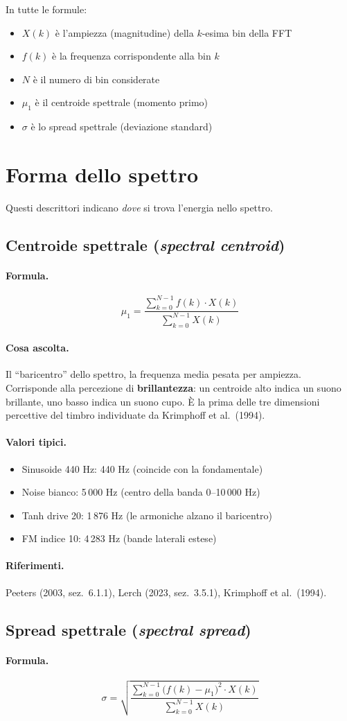 \documentclass[a4paper,11pt]{article}
\newcommand{\desc}[1]{\subsection{#1}}
\newcommand{\formula}{\paragraph{Formula.}}
\newcommand{\ascolta}{\paragraph{Cosa ascolta.}}
\newcommand{\range}{\paragraph{Valori tipici.}}
\newcommand{\rif}{\paragraph{Riferimenti.}}
\begin{document}
In tutte le formule:
\begin{itemize}[nosep]
  \item $X(k)$ è l'ampiezza (magnitudine) della $k$-esima bin della FFT
  \item $f(k)$ è la frequenza corrispondente alla bin $k$
  \item $N$ è il numero di bin considerate
  \item $\mu_1$ è il centroide spettrale (momento primo)
  \item $\sigma$ è lo spread spettrale (deviazione standard)
\end{itemize}


\section{Forma dello spettro}

Questi descrittori indicano \emph{dove} si trova l'energia nello spettro.

\desc{Centroide spettrale (\emph{spectral centroid})}

\formula
\[
  \mu_1 = \frac{\displaystyle\sum_{k=0}^{N-1} f(k) \cdot X(k)}
               {\displaystyle\sum_{k=0}^{N-1} X(k)}
\]

\ascolta
Il ``baricentro'' dello spettro, la frequenza media pesata per ampiezza.
Corrisponde alla percezione di \textbf{brillantezza}: un centroide alto
indica un suono brillante, uno basso indica un suono cupo. È la prima
delle tre dimensioni percettive del timbro individuate da
Krimphoff et al.\ (1994).

\range
\begin{itemize}[nosep]
  \item Sinusoide 440 Hz: 440 Hz (coincide con la fondamentale)
  \item Noise bianco: 5\,000 Hz (centro della banda 0--10\,000 Hz)
  \item Tanh drive 20: 1\,876 Hz (le armoniche alzano il baricentro)
  \item FM indice 10: 4\,283 Hz (bande laterali estese)
\end{itemize}

\rif Peeters (2003, sez.~6.1.1), Lerch (2023, sez.~3.5.1), Krimphoff et al.\ (1994).

\desc{Spread spettrale (\emph{spectral spread})}

\formula
\[
  \sigma = \sqrt{\frac{\displaystyle\sum_{k=0}^{N-1} \big(f(k) - \mu_1\big)^2 \cdot X(k)}
                      {\displaystyle\sum_{k=0}^{N-1} X(k)}}
\]
\end{document}
